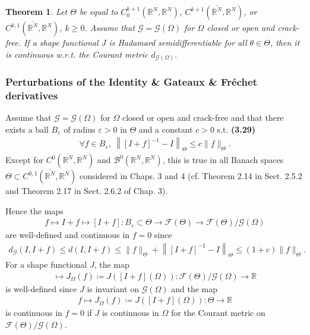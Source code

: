\documentclass[oneside]{book}
\numberwithin{equation}{section}
\newtheorem{theorem}{Theorem}[section]
\begin{document}
\begin{theorem}
    Let $\Theta$ be equal to $C_0^{k+1}(\mathbb{R}^N,\mathbb{R}^N)$, $C^{k+1}(\overline{\mathbb{R}^N},\mathbb{R}^N)$, or $C^{k,1}(\overline{\mathbb{R}^N},\mathbb{R}^N)$, $k\ge 0$. Assume that $\mathcal{G} = \mathcal{G}(\Omega)$ for $\Omega$ closed or open and crack-free. If a shape functional $J$ is Hadamard semidifferentiable for all $\theta\in\Theta$, then it is continuous w.r.t. the Courant metric $d_{\mathcal{G}(\Omega)}$.
\end{theorem}

\subsubsection{Perturbations of the Identity \& Gateaux \& Fréchet derivatives}
Assume that $\mathcal{G} = \mathcal{G}(\Omega)$ for $\Omega$ closed or open and crack-free and that there exists a ball $B_\varepsilon$ of radius $\varepsilon > 0$ in $\Theta$ and a constant $c > 0$ s.t. \textbf{(3.29)}
\begin{align*}
    \forall f\in B_\varepsilon,\ \left\|[I + f]^{-1} - I\right\|_\Theta\le c\|f\|_\Theta.
\end{align*}
Except for $C^0(\overline{\mathbb{R}^N},\mathbb{R}^N)$ and $\mathcal{B}^0(\mathbb{R}^N,\mathbb{R}^N)$, this is true in all Banach spaces $\Theta\subset C^{0,1}(\overline{\mathbb{R}^N},\mathbb{R}^N)$ considered in Chaps. 3 and 4 (cf. Theorem 2.14 in Sect. 2.5.2 and Theorem 2.17 in Sect. 2.6.2 of Chap. 3).

Hence the maps
\begin{align*}
    f\mapsto I + f\mapsto[I + f]:B_\varepsilon\subset\Theta\to\mathcal{F}(\Theta)\to\mathcal{F}(\Theta)/\mathcal{G}(\Omega)
\end{align*}
are well-defined and continuous in $f = 0$ since
\begin{align*}
    d_{\mathcal{G}}(I,I + f)\le d(I,I + f)\le\|f\|_\Theta + \left\|[I + f]^{-1} - I\right\|_\Theta\le(1 + c)\|f\|_\Theta.
\end{align*}
For a shape functional $J$, the map
\begin{align*}
    [I + f]\mapsto J_\Omega(f)\coloneqq J\left([I + f](\Omega)\right):\mathcal{F}(\Theta)/\mathcal{G}(\Omega)\to\mathbb{R}
\end{align*}
is well-defined since $J$ is invariant on $\mathcal{G}(\Omega)$ and the map
\begin{align*}
    f\mapsto J_\Omega(f)\coloneqq J\left([I + f](\Omega)\right):\Theta\to\mathbb{R}
\end{align*}
is continuous in $f = 0$ if $J$ is continuous in $\Omega$ for the Courant metric on $\mathcal{F}(\Theta)/\mathcal{G}(\Omega)$.
\end{document}
